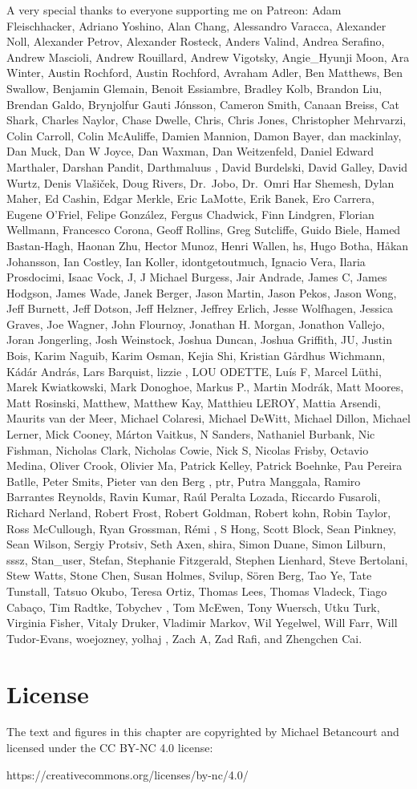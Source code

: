 \documentclass[
  letterpaper,
  DIV=11,
  numbers=noendperiod]{scrartcl}
\begin{document}
A very special thanks to everyone supporting me on Patreon: Adam
Fleischhacker, Adriano Yoshino, Alan Chang, Alessandro Varacca,
Alexander Noll, Alexander Petrov, Alexander Rosteck, Anders Valind,
Andrea Serafino, Andrew Mascioli, Andrew Rouillard, Andrew Vigotsky,
Angie\_Hyunji Moon, Ara Winter, Austin Rochford, Austin Rochford,
Avraham Adler, Ben Matthews, Ben Swallow, Benjamin Glemain, Benoit
Essiambre, Bradley Kolb, Brandon Liu, Brendan Galdo, Brynjolfur Gauti
Jónsson, Cameron Smith, Canaan Breiss, Cat Shark, Charles Naylor, Chase
Dwelle, Chris, Chris Jones, Christopher Mehrvarzi, Colin Carroll, Colin
McAuliffe, Damien Mannion, Damon Bayer, dan mackinlay, Dan Muck, Dan W
Joyce, Dan Waxman, Dan Weitzenfeld, Daniel Edward Marthaler, Darshan
Pandit, Darthmaluus , David Burdelski, David Galley, David Wurtz, Denis
Vlašiček, Doug Rivers, Dr.~Jobo, Dr.~Omri Har Shemesh, Dylan Maher, Ed
Cashin, Edgar Merkle, Eric LaMotte, Erik Banek, Ero Carrera, Eugene
O'Friel, Felipe González, Fergus Chadwick, Finn Lindgren, Florian
Wellmann, Francesco Corona, Geoff Rollins, Greg Sutcliffe, Guido Biele,
Hamed Bastan-Hagh, Haonan Zhu, Hector Munoz, Henri Wallen, hs, Hugo
Botha, Håkan Johansson, Ian Costley, Ian Koller, idontgetoutmuch,
Ignacio Vera, Ilaria Prosdocimi, Isaac Vock, J, J Michael Burgess, Jair
Andrade, James C, James Hodgson, James Wade, Janek Berger, Jason Martin,
Jason Pekos, Jason Wong, Jeff Burnett, Jeff Dotson, Jeff Helzner,
Jeffrey Erlich, Jesse Wolfhagen, Jessica Graves, Joe Wagner, John
Flournoy, Jonathan H. Morgan, Jonathon Vallejo, Joran Jongerling, Josh
Weinstock, Joshua Duncan, Joshua Griffith, JU, Justin Bois, Karim
Naguib, Karim Osman, Kejia Shi, Kristian Gårdhus Wichmann, Kádár András,
Lars Barquist, lizzie , LOU ODETTE, Luís F, Marcel Lüthi, Marek
Kwiatkowski, Mark Donoghoe, Markus P., Martin Modrák, Matt Moores, Matt
Rosinski, Matthew, Matthew Kay, Matthieu LEROY, Mattia Arsendi, Maurits
van der Meer, Michael Colaresi, Michael DeWitt, Michael Dillon, Michael
Lerner, Mick Cooney, Márton Vaitkus, N Sanders, Nathaniel Burbank, Nic
Fishman, Nicholas Clark, Nicholas Cowie, Nick S, Nicolas Frisby, Octavio
Medina, Oliver Crook, Olivier Ma, Patrick Kelley, Patrick Boehnke, Pau
Pereira Batlle, Peter Smits, Pieter van den Berg , ptr, Putra Manggala,
Ramiro Barrantes Reynolds, Ravin Kumar, Raúl Peralta Lozada, Riccardo
Fusaroli, Richard Nerland, Robert Frost, Robert Goldman, Robert kohn,
Robin Taylor, Ross McCullough, Ryan Grossman, Rémi , S Hong, Scott
Block, Sean Pinkney, Sean Wilson, Sergiy Protsiv, Seth Axen, shira,
Simon Duane, Simon Lilburn, sssz, Stan\_user, Stefan, Stephanie
Fitzgerald, Stephen Lienhard, Steve Bertolani, Stew Watts, Stone Chen,
Susan Holmes, Svilup, Sören Berg, Tao Ye, Tate Tunstall, Tatsuo Okubo,
Teresa Ortiz, Thomas Lees, Thomas Vladeck, Tiago Cabaço, Tim Radtke,
Tobychev , Tom McEwen, Tony Wuersch, Utku Turk, Virginia Fisher, Vitaly
Druker, Vladimir Markov, Wil Yegelwel, Will Farr, Will Tudor-Evans,
woejozney, yolhaj , Zach A, Zad Rafi, and Zhengchen Cai.

\section*{License}\label{license}

The text and figures in this chapter are copyrighted by Michael
Betancourt and licensed under the CC BY-NC 4.0 license:

https://creativecommons.org/licenses/by-nc/4.0/
\end{document}
